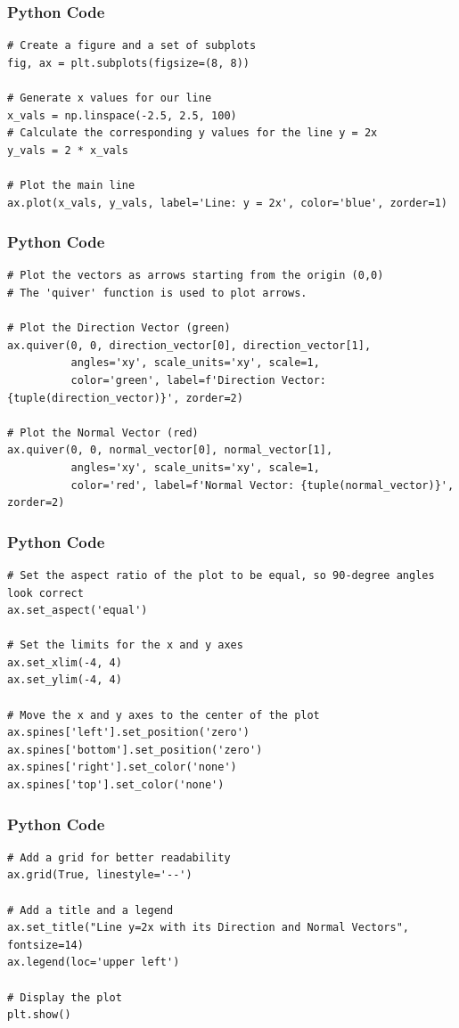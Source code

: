 \documentclass{beamer}
\begin{document}
\begin{frame}[fragile]
    \frametitle{Python Code}

    \begin{lstlisting}
# Create a figure and a set of subplots
fig, ax = plt.subplots(figsize=(8, 8))

# Generate x values for our line
x_vals = np.linspace(-2.5, 2.5, 100)
# Calculate the corresponding y values for the line y = 2x
y_vals = 2 * x_vals

# Plot the main line
ax.plot(x_vals, y_vals, label='Line: y = 2x', color='blue', zorder=1)
    \end{lstlisting}
\end{frame}

\begin{frame}[fragile]
    \frametitle{Python Code}

    \begin{lstlisting}
# Plot the vectors as arrows starting from the origin (0,0)
# The 'quiver' function is used to plot arrows.

# Plot the Direction Vector (green)
ax.quiver(0, 0, direction_vector[0], direction_vector[1],
          angles='xy', scale_units='xy', scale=1,
          color='green', label=f'Direction Vector: {tuple(direction_vector)}', zorder=2)

# Plot the Normal Vector (red)
ax.quiver(0, 0, normal_vector[0], normal_vector[1],
          angles='xy', scale_units='xy', scale=1,
          color='red', label=f'Normal Vector: {tuple(normal_vector)}', zorder=2)
\end{lstlisting}
\end{frame}

 
\begin{frame}[fragile]
    \frametitle{Python Code}

    \begin{lstlisting}
# Set the aspect ratio of the plot to be equal, so 90-degree angles look correct
ax.set_aspect('equal')

# Set the limits for the x and y axes
ax.set_xlim(-4, 4)
ax.set_ylim(-4, 4)

# Move the x and y axes to the center of the plot
ax.spines['left'].set_position('zero')
ax.spines['bottom'].set_position('zero')
ax.spines['right'].set_color('none')
ax.spines['top'].set_color('none')
\end{lstlisting}
\end{frame}
\begin{frame}[fragile]
    \frametitle{Python Code}

    \begin{lstlisting}
# Add a grid for better readability
ax.grid(True, linestyle='--')

# Add a title and a legend
ax.set_title("Line y=2x with its Direction and Normal Vectors", fontsize=14)
ax.legend(loc='upper left')

# Display the plot
plt.show()
\end{lstlisting}
\end{frame}
\end{document}
